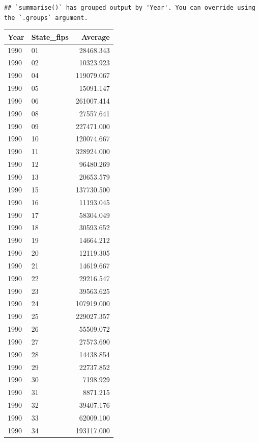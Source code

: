 \documentclass[
]{book}
\begin{document}
\begin{verbatim}
## `summarise()` has grouped output by 'Year'. You can override using the `.groups` argument.
\end{verbatim}

\begin{tabular}{l|l|r}
\hline
Year & State\_fips & Average\\
\hline
1990 & 01 & 28468.343\\
\hline
1990 & 02 & 10323.923\\
\hline
1990 & 04 & 119079.067\\
\hline
1990 & 05 & 15091.147\\
\hline
1990 & 06 & 261007.414\\
\hline
1990 & 08 & 27557.641\\
\hline
1990 & 09 & 227471.000\\
\hline
1990 & 10 & 120074.667\\
\hline
1990 & 11 & 328924.000\\
\hline
1990 & 12 & 96480.269\\
\hline
1990 & 13 & 20653.579\\
\hline
1990 & 15 & 137730.500\\
\hline
1990 & 16 & 11193.045\\
\hline
1990 & 17 & 58304.049\\
\hline
1990 & 18 & 30593.652\\
\hline
1990 & 19 & 14664.212\\
\hline
1990 & 20 & 12119.305\\
\hline
1990 & 21 & 14619.667\\
\hline
1990 & 22 & 29216.547\\
\hline
1990 & 23 & 39563.625\\
\hline
1990 & 24 & 107919.000\\
\hline
1990 & 25 & 229027.357\\
\hline
1990 & 26 & 55509.072\\
\hline
1990 & 27 & 27573.690\\
\hline
1990 & 28 & 14438.854\\
\hline
1990 & 29 & 22737.852\\
\hline
1990 & 30 & 7198.929\\
\hline
1990 & 31 & 8871.215\\
\hline
1990 & 32 & 39407.176\\
\hline
1990 & 33 & 62009.100\\
\hline
1990 & 34 & 193117.000\\
\hline

\end{tabular}
\end{document}
